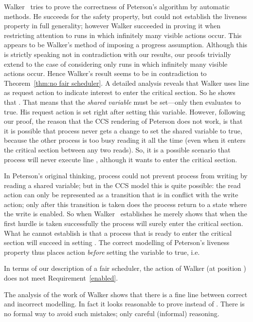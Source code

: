 \documentclass[smallcondensed]{svjour3}
\newcommand{\Thm}[1]{Theorem~\ref{thm:#1}}
\begin{document}
Walker~\cite{Walker89} tries to prove the correctness of Peterson's algorithm by automatic methods.
He succeeds for the safety property, but could not establish the liveness property
in full generality; however Walker succeeded in
proving it when restricting attention to runs in which infinitely many
visible actions occur. This appears to be Walker's method of imposing a progress assumption.
Although this is strictly speaking not in
contradiction with our results, our proofs trivially extend to the
case of considering only runs in which infinitely many visible actions
occur. Hence Walker's result seems to be in contradiction to 
\Thm{no fair scheduler}.
A detailed analysis reveals that Walker uses line  as request action to indicate 
interest to enter the critical section.
So he shows that .
That means that the \emph{shared variable}  must 
be set---only then  evaluates to true.
His request action is set right after
setting this variable. 
However, following our proof, the reason that
the CCS rendering of Peterson does not work, is that it is possible that
process \procA never gets a change to set the shared variable  to true, because the
other process is too busy reading it all the time (even when it
enters the critical section between any two reads). 
So, it is a possible scenario that process \procA will never execute line , although 
it wants to enter the critical section.

In Peterson's
original thinking, process \procB could not prevent process \procA
from writing by reading a shared variable; but in the CCS model this is
quite possible: the read action can only be represented as a transition that is in conflict with the write action;
only after this transition is taken does the process return to a state where the write is enabled.
So when Walker~\cite{Walker89} establishes 
he merely shows that when the first hurdle is taken successfully
the process will surely enter the critical section. What he cannot establish
is that a process that is ready to enter the
critical section will succeed in setting . 
The correct modelling of Peterson's liveness property
thus places action  \emph{before} setting the variable  to true, i.e.\

In terms of our description of a fair scheduler, the action  of
Walker (at position ) does not meet Requirement~\ref{enabled}.

The analysis of the work of Walker shows that there is a fine line between 
correct and incorrect modelling. In fact it looks reasonable to prove 
 instead of 
. There is
no formal way to avoid such mistakes; only careful (informal) reasoning.
\end{document}
